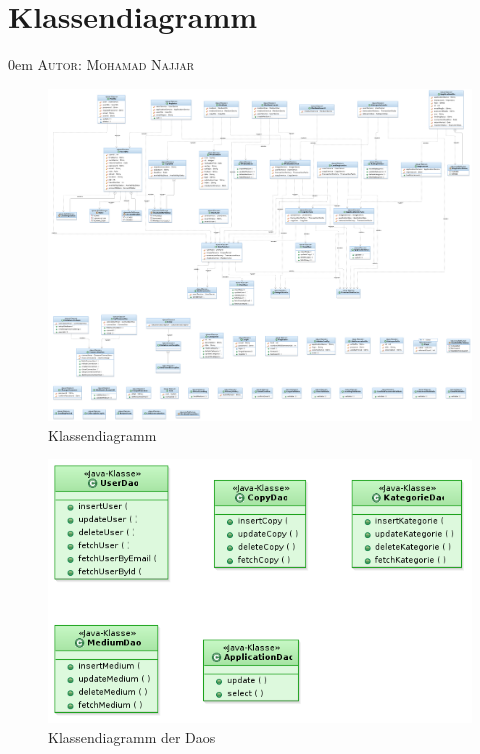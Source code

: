 \documentclass{article}
\makeatletter
\newcommand{\sectionauthor}[1]{
	{\parindent 0em \large \scshape Autor: #1 \par \nobreak \vspace*{1em}}
	\@afterheading
}
\makeatother
\begin{document}

\section{Klassendiagramm}
\sectionauthor{Mohamad Najjar}

    \begin{figure}
        \includegraphics[scale=0.2]{Klassendiagramm.png}
        \caption{Klassendiagramm}
        \label{fig:Klassendiagramm}
    \end{figure}

    \begin{figure}
        \includegraphics[scale=0.6]{KlassendiagramDao.png}
        \caption{Klassendiagramm der Daos}
        \label{fig:KlassendiagramDao}
    \end{figure}
\end{document}
